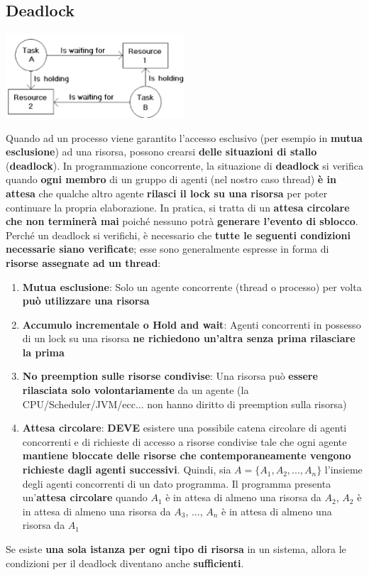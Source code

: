 \documentclass[12pt]{article}
\begin{document}
\subsection{Deadlock}
\begin{center}
    \includegraphics[width = 0.50\textwidth]{Images/104.png}
\end{center}
Quando ad un processo viene garantito l'accesso esclusivo (per esempio in \textbf{mutua esclusione}) ad una risorsa, possono crearsi \textbf{delle situazioni di stallo} (\textbf{deadlock}). In programmazione concorrente, la situazione di \textbf{deadlock} si verifica quando \textbf{ogni membro} di un gruppo di agenti (nel nostro caso thread) \textbf{è in attesa} che qualche altro agente \textbf{rilasci il lock su una risorsa} per poter continuare la propria elaborazione. In pratica, si tratta di un \textbf{attesa circolare che non terminerà mai} poiché nessuno potrà \textbf{generare l'evento di sblocco}.
Perché un deadlock si verifichi, è necessario che \textbf{tutte le seguenti condizioni necessarie siano verificate}; esse sono generalmente espresse in forma di \textbf{risorse assegnate ad un thread}:
\begin{enumerate}
    \item \textbf{Mutua esclusione}: Solo un agente concorrente (thread o processo) per volta \textbf{può utilizzare una risorsa}
    \item \textbf{Accumulo incrementale o Hold and wait}: Agenti concorrenti in possesso di un lock su una risorsa \textbf{ne richiedono un'altra senza prima rilasciare la prima}
    \item \textbf{No preemption sulle risorse condivise}: Una risorsa può \textbf{essere rilasciata solo volontariamente} da un agente (la CPU/Scheduler/JVM/ecc... non hanno diritto di preemption sulla risorsa)
    \item \textbf{Attesa circolare}: \textbf{DEVE} esistere una possibile catena circolare di agenti concorrenti e di richieste di accesso a risorse condivise tale che ogni agente \textbf{mantiene bloccate delle risorse che contemporaneamente vengono richieste dagli agenti successivi}. Quindi, sia $A = \{A_1, A_2, ..., A_n\}$ l'insieme degli agenti concorrenti di un dato programma. Il programma presenta un'\textbf{attesa circolare} quando $A_1$ è in attesa di almeno una risorsa da $A_2$, $A_2$ è in attesa di almeno una risorsa da $A_3$, ..., $A_n$ è in attesa di almeno una risorsa da $A_1$
\end{enumerate}
Se esiste \textbf{una sola istanza per ogni tipo di risorsa} in un sistema, allora le condizioni per il deadlock diventano anche \textbf{sufficienti}.
\end{document}

